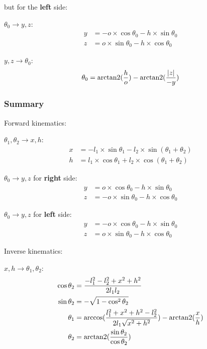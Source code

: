 but for the \textbf{left} side:

\indent\indent
$\theta_0 \rightarrow y, z$:
\begin{align*}
y &= -o \times \cos\theta_0 - h \times \sin\theta_0 \\
z &=  o \times \sin\theta_0 - h \times \cos\theta_0
\end{align*}

\indent\indent
$y, z \rightarrow \theta_0$:
\begin{equation*}
   \theta_0 = \operatorname{arctan2}(\frac{h}{o}) - \operatorname{arctan2}(\frac{\lvert z \lvert}{-y})
\end{equation*}

\subsubsection{Summary}

\noindent
Forward kinematics:

$\theta_1, \theta_2 \rightarrow x, h$:
\begin{align}
x &= -l_1 \times \sin\theta_1 - l_2 \times \sin(\theta_1 + \theta_2) \\
h &=  l_1 \times \cos\theta_1 + l_2 \times \cos(\theta_1 + \theta_2)
\end{align}

$\theta_0 \rightarrow y, z$ for \textbf{right} side:
\begin{align}
y &=  o \times \cos\theta_0 - h \times \sin\theta_0 \\
z &= -o \times \sin\theta_0 - h \times \cos\theta_0
\end{align}

$\theta_0 \rightarrow y, z$ for \textbf{left} side:
\begin{align}
y &= -o \times \cos\theta_0 - h \times \sin\theta_0 \\
z &=  o \times \sin\theta_0 - h \times \cos\theta_0
\end{align}

\noindent
Inverse kinematics:

$x, h \rightarrow \theta_1, \theta_2$:
\begin{align}
\cos\theta_2 &= \frac{-l_1^2 - l_2^2 + x^2 + h^2}{2 l_1 l_2} \\
\sin\theta_2 &= -\sqrt{1 - \cos^2\theta_2} \\
\theta_1 &= \arccos(\frac{l_1^2 + x^2 + h^2 - l_2^2}{2 l_1 \sqrt{x^2 + h^2}}) - \operatorname{arctan2}(\frac{x}{h}) \\
\theta_2 &= \operatorname{arctan2}(\frac{\sin\theta_2}{\cos\theta_2})
\end{align}


